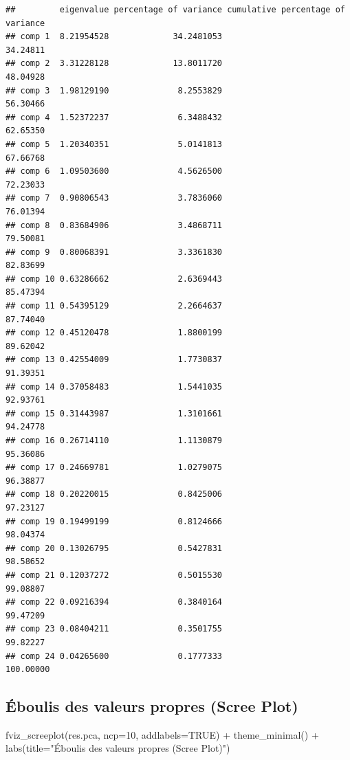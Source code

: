 \documentclass[
]{article}
\newenvironment{Shaded}{\begin{snugshade}}{\end{snugshade}}
\newcommand{\AttributeTok}[1]{\textcolor[rgb]{0.77,0.63,0.00}{#1}}
\newcommand{\ConstantTok}[1]{\textcolor[rgb]{0.00,0.00,0.00}{#1}}
\newcommand{\DecValTok}[1]{\textcolor[rgb]{0.00,0.00,0.81}{#1}}
\newcommand{\FunctionTok}[1]{\textcolor[rgb]{0.00,0.00,0.00}{#1}}
\newcommand{\NormalTok}[1]{#1}
\newcommand{\SpecialCharTok}[1]{\textcolor[rgb]{0.00,0.00,0.00}{#1}}
\newcommand{\StringTok}[1]{\textcolor[rgb]{0.31,0.60,0.02}{#1}}
\begin{document}
\begin{verbatim}
##         eigenvalue percentage of variance cumulative percentage of variance
## comp 1  8.21954528             34.2481053                          34.24811
## comp 2  3.31228128             13.8011720                          48.04928
## comp 3  1.98129190              8.2553829                          56.30466
## comp 4  1.52372237              6.3488432                          62.65350
## comp 5  1.20340351              5.0141813                          67.66768
## comp 6  1.09503600              4.5626500                          72.23033
## comp 7  0.90806543              3.7836060                          76.01394
## comp 8  0.83684906              3.4868711                          79.50081
## comp 9  0.80068391              3.3361830                          82.83699
## comp 10 0.63286662              2.6369443                          85.47394
## comp 11 0.54395129              2.2664637                          87.74040
## comp 12 0.45120478              1.8800199                          89.62042
## comp 13 0.42554009              1.7730837                          91.39351
## comp 14 0.37058483              1.5441035                          92.93761
## comp 15 0.31443987              1.3101661                          94.24778
## comp 16 0.26714110              1.1130879                          95.36086
## comp 17 0.24669781              1.0279075                          96.38877
## comp 18 0.20220015              0.8425006                          97.23127
## comp 19 0.19499199              0.8124666                          98.04374
## comp 20 0.13026795              0.5427831                          98.58652
## comp 21 0.12037272              0.5015530                          99.08807
## comp 22 0.09216394              0.3840164                          99.47209
## comp 23 0.08404211              0.3501755                          99.82227
## comp 24 0.04265600              0.1777333                         100.00000
\end{verbatim}

\hypertarget{uxe9boulis-des-valeurs-propres-scree-plot}{%
\subsection{Éboulis des valeurs propres (Scree
Plot)}\label{uxe9boulis-des-valeurs-propres-scree-plot}}

\begin{Shaded}
\begin{Highlighting}[]
\FunctionTok{fviz\_screeplot}\NormalTok{(res.pca, }\AttributeTok{ncp=}\DecValTok{10}\NormalTok{, }\AttributeTok{addlabels=}\ConstantTok{TRUE}\NormalTok{) }\SpecialCharTok{+} 
  \FunctionTok{theme\_minimal}\NormalTok{() }\SpecialCharTok{+} 
  \FunctionTok{labs}\NormalTok{(}\AttributeTok{title=}\StringTok{"Éboulis des valeurs propres (Scree Plot)"}\NormalTok{)}
\end{Highlighting}
\end{Shaded}
\end{document}
